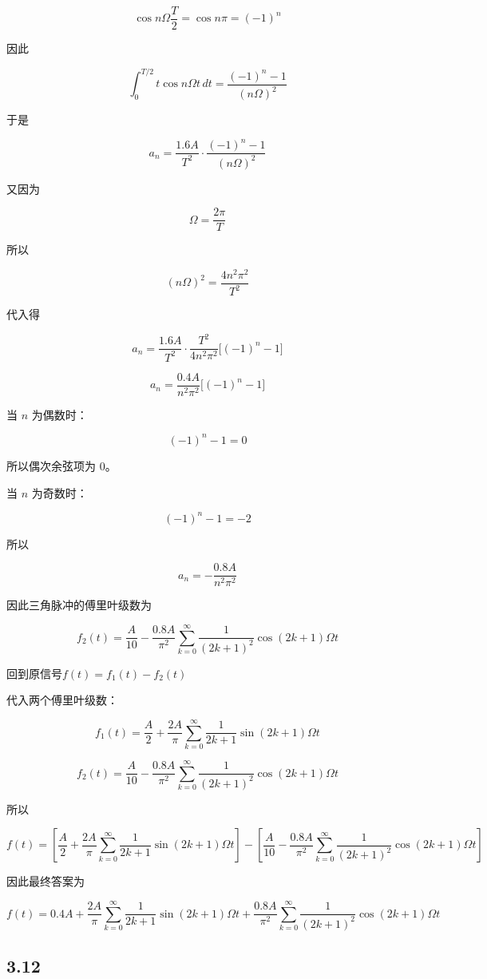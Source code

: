 \documentclass[UTF8]{ctexart}
\begin{document}
\begin{solution}
$$
\cos n\Omega\frac{T}{2}=\cos n\pi=(-1)^n
$$

因此

$$
\int_0^{T/2}t\cos n\Omega t\,dt
=\frac{(-1)^n-1}{(n\Omega)^2}
$$

于是

$$
a_n=\frac{1.6A}{T^2}\cdot\frac{(-1)^n-1}{(n\Omega)^2}
$$

又因为

$$
\Omega=\frac{2\pi}{T}
$$

所以

$$
(n\Omega)^2=\frac{4n^2\pi^2}{T^2}
$$

代入得

$$
a_n=
\frac{1.6A}{T^2}\cdot\frac{T^2}{4n^2\pi^2}\bigl[(-1)^n-1\bigr]
$$

$$
a_n=\frac{0.4A}{n^2\pi^2}\bigl[(-1)^n-1\bigr]
$$

当 $n$ 为偶数时：

$$
(-1)^n-1=0
$$

所以偶次余弦项为 $0$。

当 $n$ 为奇数时：

$$
(-1)^n-1=-2
$$

所以

$$
a_n=-\frac{0.8A}{n^2\pi^2}
$$

因此三角脉冲的傅里叶级数为

$$
f_2(t)
=\frac{A}{10}
-\frac{0.8A}{\pi^2}\sum_{k=0}^{\infty}
\frac{1}{(2k+1)^2}\cos(2k+1)\Omega t
$$

回到原信号$f(t)=f_1(t)-f_2(t)$

代入两个傅里叶级数：

$$
f_1(t)=
\frac{A}{2}
+\frac{2A}{\pi}\sum_{k=0}^{\infty}
\frac{1}{2k+1}\sin(2k+1)\Omega t
$$

$$
f_2(t)=
\frac{A}{10}
-\frac{0.8A}{\pi^2}\sum_{k=0}^{\infty}
\frac{1}{(2k+1)^2}\cos(2k+1)\Omega t
$$

所以

$$
f(t)=
\left[
\frac{A}{2}
+\frac{2A}{\pi}\sum_{k=0}^{\infty}
\frac{1}{2k+1}\sin(2k+1)\Omega t
\right]
-
\left[
\frac{A}{10}
-\frac{0.8A}{\pi^2}\sum_{k=0}^{\infty}
\frac{1}{(2k+1)^2}\cos(2k+1)\Omega t
\right]
$$

因此最终答案为

$$
f(t)=0.4A
+\frac{2A}{\pi}\sum_{k=0}^{\infty}
\frac{1}{2k+1}\sin(2k+1)\Omega t
+\frac{0.8A}{\pi^2}\sum_{k=0}^{\infty}
\frac{1}{(2k+1)^2}\cos(2k+1)\Omega t
$$
\end{solution}

\subsection{3.12}
\end{document}
